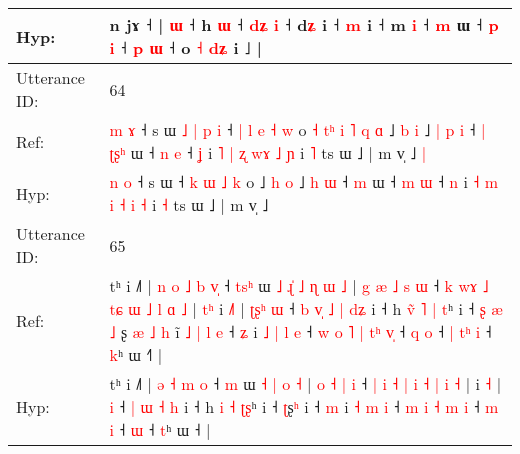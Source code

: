\documentclass[10pt]{article}
\DeclareRobustCommand{\hl}[1]{{\textcolor{red}{#1}}}
\begin{document}
\begin{longtable}{ll}
 \\
Hyp: & n jɤ\hl{}\hl{}\hl{}\hl{}\hl{}\hl{} ˧ |\hl{}\hl{}\hl{} \hl{ɯ} ˧ h \hl{}\hl{ɯ} ˧ \hl{d}\hl{ʑ} \hl{}\hl{i} ˧ d\hl{ʑ} i ˧\hl{}\hl{}\hl{} \hl{}\hl{m} i ˧ m \hl{}\hl{i} ˧ \hl{}\hl{m} ɯ ˧\hl{}\hl{}\hl{} \hl{p} \hl{i} ˧ \hl{p} \hl{}\hl{ɯ} ˧\hl{}\hl{}\hl{}\hl{}\hl{}\hl{}\hl{}\hl{}\hl{} o\hl{}\hl{}\hl{}\hl{} \hl{˧} \hl{}\hl{d}\hl{ʑ} i ˩ |
 \\
\midrule
Utterance ID: & 64 \\
Ref: & \hl{m} \hl{ɤ} ˧ s ɯ\hl{ }\hl{˩}\hl{ }\hl{|}\hl{ }\hl{p}\hl{ }\hl{i} ˧\hl{ }\hl{|} \hl{l} \hl{e} \hl{˧} \hl{w} o\hl{ }\hl{˧}\hl{ }\hl{t}\hl{ʰ}\hl{ }\hl{i}\hl{ }\hl{˥}\hl{ }\hl{q}\hl{ }\hl{ɑ} ˩ \hl{b} \hl{i} ˩\hl{ }\hl{|} \hl{p} \hl{i} ˧\hl{ }\hl{|} \hl{ʈ}\hl{ʂ}\hl{ʰ} ɯ ˧ \hl{n} \hl{e} ˧ \hl{ʝ} i \hl{˥} \hl{|} \hl{ʐ} \hl{w}\hl{ɤ} \hl{˩} \hl{ɲ} i \hl{˥} ts ɯ ˩ | m v̩ ˩\hl{ }\hl{|}
 \\
Hyp: & \hl{n} \hl{o} ˧ s ɯ\hl{}\hl{}\hl{}\hl{}\hl{}\hl{}\hl{}\hl{} ˧\hl{}\hl{} \hl{k} \hl{ɯ} \hl{˩} \hl{k} o\hl{}\hl{}\hl{}\hl{}\hl{}\hl{}\hl{}\hl{}\hl{}\hl{}\hl{}\hl{}\hl{} ˩ \hl{h} \hl{o} ˩\hl{}\hl{} \hl{h} \hl{ɯ} ˧\hl{}\hl{} \hl{}\hl{}\hl{m} ɯ ˧ \hl{m} \hl{ɯ} ˧ \hl{n} i \hl{˧} \hl{m} \hl{i} \hl{}\hl{˧} \hl{i} \hl{˧} i \hl{˧} ts ɯ ˩ | m v̩ ˩\hl{}\hl{}
 \\
\midrule
Utterance ID: & 65 \\
Ref: & tʰ i ˩˥ |\hl{ }\hl{n} \hl{o} \hl{˩} \hl{b} \hl{v}\hl{̩} ˧ \hl{t}\hl{s}\hl{ʰ} ɯ\hl{ }\hl{˩}\hl{ }\hl{ɻ}\hl{̍} \hl{˩} \hl{ɳ} \hl{ɯ} \hl{˩} |\hl{ }\hl{g} \hl{æ} \hl{˩} \hl{s} \hl{ɯ} ˧ \hl{k} \hl{w}\hl{ɤ} \hl{˩} \hl{t}\hl{ɕ} \hl{ɯ} \hl{˩} \hl{l} \hl{ɑ} \hl{˩} |\hl{ }\hl{t}\hl{ʰ} i \hl{˩}\hl{˥} |\hl{ }\hl{ʈ}\hl{ʂ}\hl{ʰ} \hl{ɯ} ˧\hl{ }\hl{b} \hl{v}\hl{̩} \hl{˩} \hl{|} \hl{d}\hl{ʑ} i ˧ h \hl{v}\hl{̃} \hl{˥} \hl{|}\hl{ }\hl{t}ʰ i ˧\hl{ }\hl{ʂ}\hl{ }\hl{æ} \hl{˩}\hl{ }ʂ\hl{ }\hl{æ}\hl{ }\hl{˩}\hl{ }\hl{h} i\hl{̃}\hl{ }\hl{˩}\hl{ }\hl{|}\hl{ }\hl{l}\hl{ }\hl{e} ˧ \hl{ʑ} i\hl{ }\hl{˩} \hl{|} \hl{l} \hl{e} ˧\hl{ }\hl{w} \hl{o} \hl{˥} \hl{|} \hl{t}\hl{ʰ} \hl{v}\hl{̩} ˧ \hl{q} \hl{o} ˧\hl{ }\hl{|}\hl{ }\hl{t}\hl{ʰ} \hl{i} ˧ \hl{k}ʰ ɯ ˧\hl{˥} |
 \\
Hyp: & tʰ i ˩˥ |\hl{}\hl{} \hl{ə} \hl{˧} \hl{m} \hl{}\hl{o} ˧ \hl{}\hl{}\hl{m} ɯ\hl{}\hl{}\hl{}\hl{}\hl{} \hl{˧} \hl{|} \hl{o} \hl{˧} |\hl{}\hl{} \hl{o} \hl{˧} \hl{|} \hl{i} ˧ \hl{|} \hl{}\hl{i} \hl{˧} \hl{}\hl{|} \hl{i} \hl{˧} \hl{|} \hl{i} \hl{˧} |\hl{}\hl{}\hl{} i \hl{}\hl{˧} |\hl{}\hl{}\hl{}\hl{} \hl{i} ˧\hl{}\hl{} \hl{}\hl{|} \hl{ɯ} \hl{˧} \hl{}\hl{h} i ˧ h \hl{}\hl{i} \hl{˧} \hl{}\hl{ʈ}\hl{ʂ}ʰ i ˧\hl{}\hl{}\hl{}\hl{} \hl{}\hl{ʈ}ʂ\hl{}\hl{}\hl{}\hl{}\hl{}\hl{ʰ} i\hl{}\hl{}\hl{}\hl{}\hl{}\hl{}\hl{}\hl{}\hl{} ˧ \hl{m} i\hl{}\hl{} \hl{˧} \hl{m} \hl{i} ˧\hl{}\hl{} \hl{m} \hl{i} \hl{˧} \hl{}\hl{m} \hl{}\hl{i} ˧ \hl{m} \hl{i} ˧\hl{}\hl{}\hl{}\hl{}\hl{} \hl{ɯ} ˧ \hl{t}ʰ ɯ ˧\hl{} |

\end{longtable}
\end{document}
